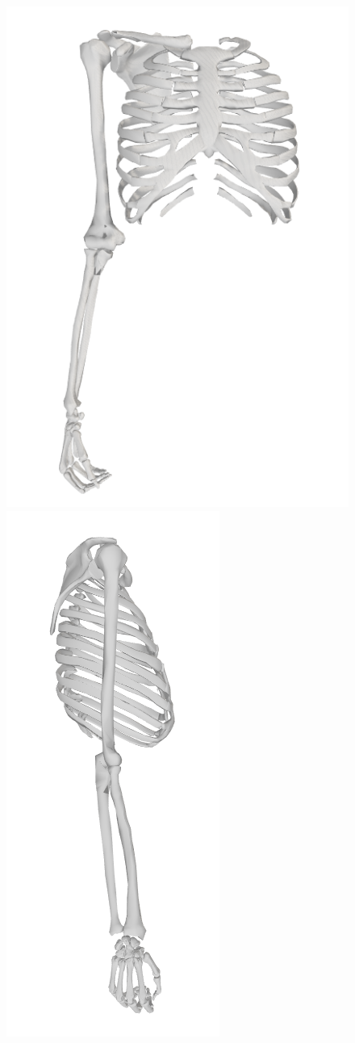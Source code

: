 \begin{figure}[!htb]
\begin{minipage}{0.3\linewidth}
        \includegraphics[trim={0 0 0 0}, clip, width=0.8\linewidth]{img/chapter_4/stanford_frontal_coronal.png}
    \end{minipage}
    \hfill
    \begin{minipage}{0.3\linewidth}
        \captionsetup{justification=centering}
        \centering
        \includegraphics[trim={0 0 0 0}, clip, width=0.5\linewidth]{img/chapter_4/stanford_sagittal.png}

\end{minipage}
\end{figure}
